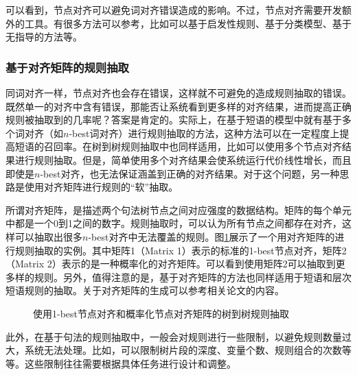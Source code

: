 \parinterval 可以看到，节点对齐可以避免词对齐错误造成的影响。不过，节点对齐需要开发额外的工具。有很多方法可以参考，比如可以基于启发性规则\cite{DBLP:conf/coling/GrovesHW04}、基于分类模型\cite{DBLP:conf/coling/SunZT10}、基于无指导的方法\cite{xiao2013unsupervised}等。


\subsubsection{基于对齐矩阵的规则抽取}

\parinterval 同词对齐一样，节点对齐也会存在错误，这样就不可避免的造成规则抽取的错误。既然单一的对齐中含有错误，那能否让系统看到更多样的对齐结果，进而提高正确规则被抽取到的几率呢？答案是肯定的。实际上，在基于短语的模型中就有基于多个词对齐（如$n$-best词对齐）进行规则抽取的方法，这种方法可以在一定程度上提高短语的召回率。在树到树规则抽取中也同样适用，比如可以使用多个节点对齐结果进行规则抽取。但是，简单使用多个对齐结果会使系统运行代价线性增长，而且即使是$n$-best对齐，也无法保证涵盖到正确的对齐结果。对于这个问题，另一种思路是使用对齐矩阵进行规则的``软''抽取。

\parinterval 所谓对齐矩阵，是描述两个句法树节点之间对应强度的数据结构。矩阵的每个单元中都是一个0到1之间的数字。规则抽取时，可以认为所有节点之间都存在对齐，这样可以抽取出很多$n$-best对齐中无法覆盖的规则。图\ref{fig:4-63}展示了一个用对齐矩阵的进行规则抽取的实例。其中矩阵1（Matrix 1）表示的标准的1-best节点对齐，矩阵2（Matrix 2）表示的是一种概率化的对齐矩阵。可以看到使用矩阵2可以抽取到更多样的规则。另外，值得注意的是，基于对齐矩阵的方法也同样适用于短语和层次短语规则的抽取。关于对齐矩阵的生成可以参考相关论文的内容\cite{xiao2013unsupervised,liu2009weighted,sun2010exploring,sun2010discriminative}。

\begin{figure}[htp]
\centering

\caption{使用1-best节点对齐和概率化节点对齐矩阵的树到树规则抽取\cite{xiao2013unsupervised}}
\label{fig:4-63}
\end{figure}

\parinterval 此外，在基于句法的规则抽取中，一般会对规则进行一些限制，以避免规则数量过大，系统无法处理。比如，可以限制树片段的深度、变量个数、规则组合的次数等等。这些限制往往需要根据具体任务进行设计和调整。

